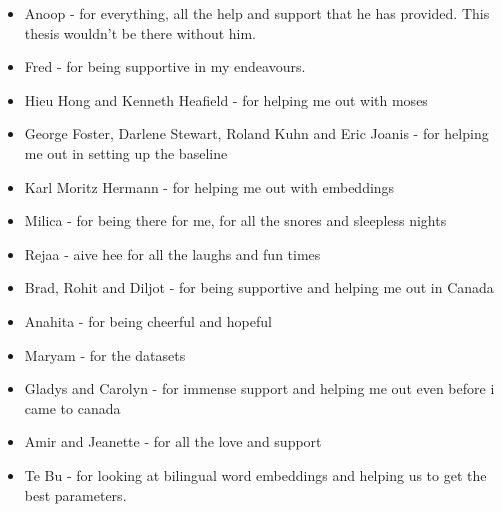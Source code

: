 
%
%

\begin{acknowledgements} %
\begin{itemize}
	\item Anoop - for everything, all the help and support that he has provided. This thesis wouldn't be there without him.
	\item Fred - for being supportive in my endeavours.
	\item Hieu Hong and Kenneth Heafield - for helping me out with moses
	\item George Foster, Darlene Stewart, Roland Kuhn and Eric Joanis - for helping me out in setting up the baseline
	\item Karl Moritz Hermann - for helping me out with embeddings
	\item Milica - for being there for me, for all the snores and sleepless nights
	\item Rejaa - aive hee for all the laughs and fun times
	\item Brad, Rohit and Diljot - for being supportive and helping me out in Canada
	\item Anahita - for being cheerful and hopeful
	\item Maryam - for the datasets
	\item Gladys and Carolyn - for immense support and helping me out even before i came to canada
	\item Amir and Jeanette - for all the love and support
	\item Te Bu - for looking at bilingual word embeddings and helping us to get the best parameters.
\end{itemize}
\end{acknowledgements}
